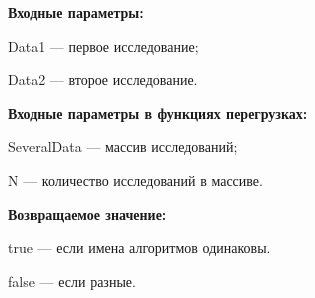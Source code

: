 \textbf{Входные параметры:}

Data1 --- первое исследование;
 
Data2 --- второе исследование.
	 
\textbf{Входные параметры в функциях перегрузках:}

SeveralData --- массив исследований;
 
N --- количество исследований в массиве.

\textbf{Возвращаемое значение:}

true --- если имена алгоритмов одинаковы.
 
false --- если разные.